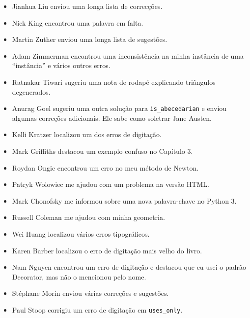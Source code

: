 \documentclass[10pt]{book}
\begin{document}
\begin {itemize}
\item Jianhua Liu enviou uma longa lista de correcções.

\item Nick King encontrou uma palavra em falta.

\item Martin Zuther enviou uma longa lista de sugestões.

\item Adam Zimmerman encontrou uma inconsistência na minha instância
de uma ``instância'' e vários outros erros.

\item Ratnakar Tiwari sugeriu uma nota de rodapé explicando triângulos
degenerados.

\item Anurag Goel sugeriu uma outra solução para \verb"is_abecedarian"
e enviou algumas correções adicionais. Ele sabe como
soletrar Jane Austen.

\item Kelli Kratzer localizou um dos erros de digitação.

\item Mark Griffiths destacou um exemplo confuso no Capítulo 3.

\item Roydan Ongie encontrou um erro no meu método de Newton.

\item Patryk Wolowiec me ajudou com um problema na versão HTML.

\item Mark Chonofsky me informou sobre uma nova palavra-chave no Python 3.

\item Russell Coleman me ajudou com minha geometria.

\item Wei Huang localizou vários erros tipográficos.

\item Karen Barber localizou o erro de digitação mais velho do livro.

\item Nam Nguyen encontrou um erro de digitação e destacou que eu usei o padrão
Decorator, mas não o mencionou pelo nome.

\item St\'{e}phane Morin enviou várias correções e sugestões.

\item Paul Stoop corrigiu um erro de digitação em \verb+uses_only+.


\end{itemize}
\end{document}
